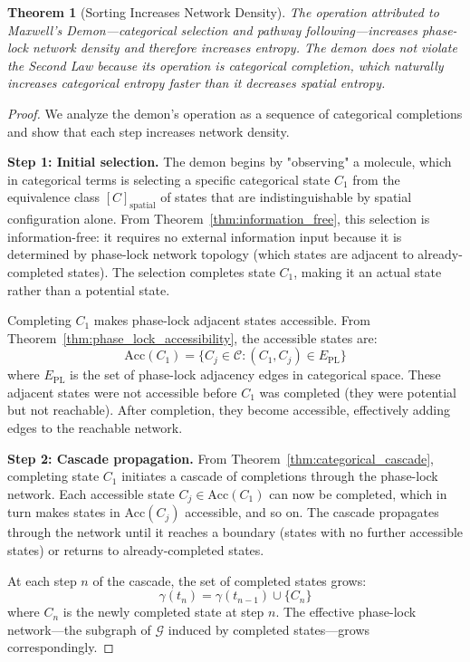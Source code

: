 \documentclass[12pt,a4paper]{article}
\newtheorem{theorem}{Theorem}[section]
\theoremstyle{definition}
\theoremstyle{remark}
\newcommand{\phaselockgraph}{\mathcal{G}}
\newcommand{\catspace}{\mathcal{C}}
\newcommand{\accessible}{\text{Acc}}
\begin{document}
\begin{theorem}[Sorting Increases Network Density]
\label{thm:sorting_density}
The operation attributed to Maxwell's Demon—categorical selection and pathway following—increases phase-lock network density and therefore increases entropy. The demon does not violate the Second Law because its operation is categorical completion, which naturally increases categorical entropy faster than it decreases spatial entropy.
\end{theorem}

\begin{proof}
We analyze the demon's operation as a sequence of categorical completions and show that each step increases network density.

\textbf{Step 1: Initial selection.}
The demon begins by "observing" a molecule, which in categorical terms is selecting a specific categorical state $C_1$ from the equivalence class $[C]_{\text{spatial}}$ of states that are indistinguishable by spatial configuration alone. From Theorem~\ref{thm:information_free}, this selection is information-free: it requires no external information input because it is determined by phase-lock network topology (which states are adjacent to already-completed states). The selection completes state $C_1$, making it an actual state rather than a potential state.

Completing $C_1$ makes phase-lock adjacent states accessible. From Theorem~\ref{thm:phase_lock_accessibility}, the accessible states are:
\begin{equation}
\accessible(C_1) = \{C_j \in \catspace : (C_1, C_j) \in E_{\text{PL}}\}
\end{equation}
where $E_{\text{PL}}$ is the set of phase-lock adjacency edges in categorical space. These adjacent states were not accessible before $C_1$ was completed (they were potential but not reachable). After completion, they become accessible, effectively adding edges to the reachable network.

\textbf{Step 2: Cascade propagation.}
From Theorem~\ref{thm:categorical_cascade}, completing state $C_1$ initiates a cascade of completions through the phase-lock network. Each accessible state $C_j \in \accessible(C_1)$ can now be completed, which in turn makes states in $\accessible(C_j)$ accessible, and so on. The cascade propagates through the network until it reaches a boundary (states with no further accessible states) or returns to already-completed states.

At each step $n$ of the cascade, the set of completed states grows:
\begin{equation}
\gamma(t_n) = \gamma(t_{n-1}) \cup \{C_n\}
\end{equation}
where $C_n$ is the newly completed state at step $n$. The effective phase-lock network—the subgraph of $\phaselockgraph$ induced by completed states—grows correspondingly.


\end{proof}
\end{document}
